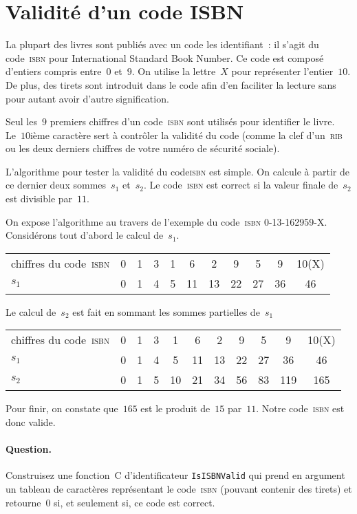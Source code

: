 \section{Validit\'e d'un code ISBN}
\label{sec:CodeISBN}
La plupart des livres sont  publi\'es avec un code les identifiant~:
il s'agit  du code~\textsc{isbn} pour  International Standard  Book Number. Ce
code est compos\'e d'entiers  compris entre~$0$ et~$9$. On utilise  la
lettre~$X$ pour repr\'esenter l'entier~$10$. De  plus, des tirets sont
introduit dans le code afin d'en faciliter la lecture sans pour autant
avoir d'autre signification.
\par
Seul les~$9$ premiers chiffres   d'un code~\textsc{isbn} sont  utilis\'es  pour
identifier le  livre.  Le~$10$i\`eme  caract\`ere sert \`a contr\^oler
la validit\'e du  code (comme la clef  d'un~\textsc{rib} ou  les deux derniers
chiffres de votre num\'ero de s\'ecurit\'e sociale).
\par
L'algorithme  pour tester la validit\'e du  code\textsc{isbn}  est simple.  On
calcule \`a  partir de ce  dernier deux  sommes~$s_{1}$ et~$s_{2}$. Le
code~\textsc{isbn} est correct si  la  valeur finale de~$s_{2}$ est  divisible
par~$11$.
\par
On   expose l'algorithme  au   travers de   l'exemple  du    code~\textsc{isbn}
0-13-162959-X.  Consid\'erons tout d'abord le calcul de~$s_{1}$.
\par
\begin{tabular}{lcccccccccc}
chiffres du code~\textsc{isbn} &  0 &  1 &  3 &  1 &  6 &  2 &  9 &  5 &  9 &  10(X)\\
$s_{1}$ & 0 &   1 &  4 &  5 & 11 & 13 & 22 & 27 & 36 &  46
\end{tabular}
\par
Le calcul de~$s_{2}$ est fait en sommant les sommes partielles de~$s_{1}$
\par
\begin{tabular}{lcccccccccc}
chiffres du code~\textsc{isbn} &  0 &  1 &  3 &  1 &  6 &  2 &  9 &  5 &  9 &  10(X)\\
$s_{1}$ & 0 &   1 &  4 &  5 & 11 & 13 & 22 & 27 & 36 &  46 \\
$s_{2}$ & 0 &  1 &  5 & 10 & 21 & 34&  56&  83&  119 & 165 
\end{tabular}
\par
Pour  finir,  on constate que~$165$  est  le produit de~$15$ par~$11$. 
Notre code~\textsc{isbn} est donc valide.
\paragraph{Question.}
Construisez une fonction~C d'identificateur \verb+IsISBNValid+ qui
prend en argument un tableau de caract\`eres repr\'esentant le code~\textsc{isbn} (pouvant contenir des tirets)
et retourne~$0$ si, et seulement si, ce code est correct.

